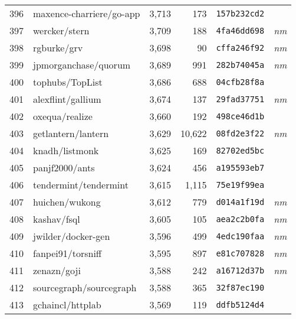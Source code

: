 {\begin{supertabular}{llrrll}
        396 &           maxence-charriere/go-app &  3,713 &    173 &  \texttt{157b232cd2} &              \\
        397 &                      wercker/stern &  3,709 &    188 &  \texttt{4fa46dd698} &  \textit{nm} \\
        398 &                        rgburke/grv &  3,698 &     90 &  \texttt{cffa246f92} &  \textit{nm} \\
        399 &               jpmorganchase/quorum &  3,689 &    991 &  \texttt{282b74045a} &  \textit{nm} \\
        400 &                    tophubs/TopList &  3,686 &    688 &  \texttt{04cfb28f8a} &              \\
        401 &                  alexflint/gallium &  3,674 &    137 &  \texttt{29fad37751} &  \textit{nm} \\
        402 &                     oxequa/realize &  3,660 &    192 &  \texttt{498ce46d1b} &              \\
        403 &                 getlantern/lantern &  3,629 & 10,622 &  \texttt{08fd2e3f22} &  \textit{nm} \\
        404 &                     knadh/listmonk &  3,625 &    169 &  \texttt{82702ed5bc} &              \\
        405 &                     panjf2000/ants &  3,624 &    456 &  \texttt{a195593eb7} &              \\
        406 &              tendermint/tendermint &  3,615 &  1,115 &  \texttt{75e19f99ea} &              \\
        407 &                     huichen/wukong &  3,612 &    779 &  \texttt{d014a1f19d} &  \textit{nm} \\
        408 &                        kashav/fsql &  3,605 &    105 &  \texttt{aea2c2b0fa} &  \textit{nm} \\
        409 &                 jwilder/docker-gen &  3,596 &    499 &  \texttt{4edc190faa} &  \textit{nm} \\
        410 &                  fanpei91/torsniff &  3,595 &    897 &  \texttt{e81c707828} &  \textit{nm} \\
        411 &                        zenazn/goji &  3,588 &    242 &  \texttt{a16712d37b} &  \textit{nm} \\
        412 &            sourcegraph/sourcegraph &  3,588 &    365 &  \texttt{32f87ec190} &              \\
        413 &                   gchaincl/httplab &  3,569 &    119 &  \texttt{ddfb5124d4} &              \\

\end{supertabular}}
